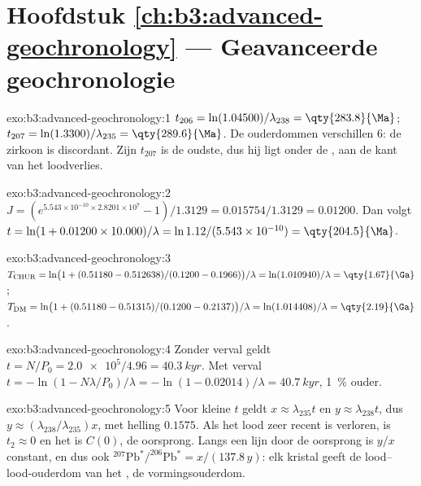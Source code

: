 \section*{Hoofdstuk \ref{ch:b3:advanced-geochronology} --- Geavanceerde geochronologie}

\begin{solution}{exo:b3:advanced-geochronology:1}
$t_{206} = \ln(1.04500)/\lambda_{238} = \qty{283.8}{\Ma}$; $t_{207} =
\ln(1.3300)/\lambda_{235} = \qty{289.6}{\Ma}$. De ouderdommen verschillen
\qty{6}{\Ma}: de zirkoon is discordant. Zijn $t_{207}$ is de oudste, dus hij ligt
onder de , aan de kant van het loodverlies.
\end{solution}

\begin{solution}{exo:b3:advanced-geochronology:2}
$J = (e^{5.543\times10^{-10}\times2.8201\times10^7} - 1)/1.3129 =
0.015754/1.3129 = 0.01200$. Dan volgt $t = \ln(1 + 0.01200\times10.000)/\lambda =
\ln 1.12/(5.543\times10^{-10}) = \qty{204.5}{\Ma}$.
\end{solution}

\begin{solution}{exo:b3:advanced-geochronology:3}
$T_{\mathrm{CHUR}} = \ln\bigl(1 + (0.51180 - 0.512638)/(0.1200 -
0.1966)\bigr)/\lambda = \ln(1.010940)/\lambda = \qty{1.67}{\Ga}$;
$T_{\mathrm{DM}} = \ln\bigl(1 + (0.51180 - 0.51315)/(0.1200 - 0.2137)\bigr)/\lambda
= \ln(1.014408)/\lambda = \qty{2.19}{\Ga}$.
\end{solution}

\begin{solution}{exo:b3:advanced-geochronology:4}
Zonder verval geldt $t = N/P_0 = \num{2.0e5}/4.96 = \qty{40.3}{kyr}$. Met verval
$t = -\ln(1 - N\lambda/P_0)/\lambda = -\ln(1 - 0.02014)/\lambda =
\qty{40.7}{kyr}$, \qty{1}{\percent} ouder.
\end{solution}

\begin{solution}{exo:b3:advanced-geochronology:5}
Voor kleine $t$ geldt $x \approx \lambda_{235}t$ en $y \approx \lambda_{238}t$, dus
$y \approx (\lambda_{238}/\lambda_{235})x$, met helling $0.1575$. Als het lood
zeer recent is verloren, is $t_2 \approx 0$ en het  is $C(0)$,
de oorsprong. Langs een lijn door de oorsprong is $y/x$ constant, en dus ook
$^{207}\mathrm{Pb}^*/^{206}\mathrm{Pb}^* = x/(137.8\,y)$: elk kristal geeft
de lood--lood-ouderdom van het , de vormingsouderdom.
\end{solution}

